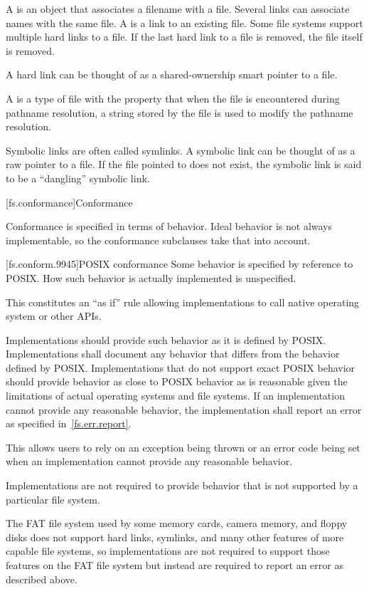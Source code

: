 \pnum
A  is
an object that associates a filename with a file. Several links can associate names with the same file.
A  is
a link to an existing file. Some
file systems support multiple hard links to a file. If the last hard link to a
file is removed, the file itself is removed.
\begin{note} A hard link can be thought of as a shared-ownership smart
pointer to a file.\end{note}
A  is
a type of file with the
property that when the file is encountered during pathname resolution, a string
stored by the file is used to modify the pathname resolution.
\begin{note} Symbolic links are often called symlinks. A symbolic link can be thought of as a raw pointer to a file.
If the file pointed to does not exist, the symbolic link is said to be a
``dangling'' symbolic link.\end{note}

[fs.conformance]{Conformance}

\pnum
Conformance is specified in terms of behavior. Ideal behavior is not always
implementable, so the conformance subclauses take that into account.

[fs.conform.9945]{POSIX conformance}
\pnum
Some behavior is specified by reference to POSIX. How such behavior is actually implemented is unspecified.
\begin{note} This constitutes an ``as if'' rule allowing implementations
to call native
operating system or other APIs. \end{note}

\pnum
Implementations should provide such behavior as it is defined by
POSIX\@. Implementations shall document any behavior that differs from the
behavior defined by POSIX\@. Implementations that do not support exact POSIX
behavior should provide behavior as close to POSIX behavior as is reasonable given the
limitations of actual operating systems and file systems. If an implementation cannot provide any
reasonable behavior, the implementation shall report an error as specified in~\ref{fs.err.report}.
\begin{note} This allows users to rely on an exception being thrown or
an error code being set when an implementation cannot provide any reasonable
behavior.\end{note}

\pnum
Implementations are not required to provide behavior that is not supported by
a particular file system.
\begin{example} The FAT file system used by some memory cards, camera memory, and
floppy disks does not support hard links, symlinks, and many other features of
more capable file systems, so implementations are not required to support those
features on the FAT file system
but instead are required to report an error as described above.
\end{example}

